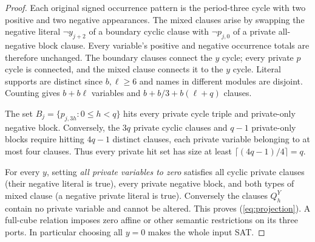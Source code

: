 \documentclass[10pt]{article}
\begin{document}
\begin{proof}
Each original signed occurrence pattern is the period-three cycle with two positive and two negative appearances. The mixed clauses arise by swapping the negative literal $\neg y_{j+2}$ of a boundary cyclic clause with $\neg p_{j,0}$ of a private all-negative block clause. Every variable's positive and negative occurrence totals are therefore unchanged. The boundary clauses connect the $y$ cycle; every private $p$ cycle is connected, and the mixed clause connects it to the $y$ cycle. Literal supports are distinct since $b,\ell\ge6$ and names in different modules are disjoint. Counting gives $b+b\ell$ variables and $b+b/3+b(\ell+q)$ clauses.

The set $B_j=\{p_{j,3h}:0\le h<q\}$ hits every private cycle triple and private-only negative block. Conversely, the $3q$ private cyclic clauses and $q-1$ private-only blocks require hitting $4q-1$ distinct clauses, each private variable belonging to at most four clauses. Thus every private hit set has size at least $\lceil(4q-1)/4\rceil=q$.

For every $y$, setting \emph{all private variables to zero} satisfies all cyclic private clauses (their negative literal is true), every private negative block, and both types of mixed clause (a negative private literal is true). Conversely the clauses $Q_h^Y$ contain no private variable and cannot be altered. This proves (\ref{eq:projection}). A full-cube relation imposes zero affine or other semantic restrictions on its three ports. In particular choosing all $y=0$ makes the whole input SAT.
\end{proof}
\end{document}
